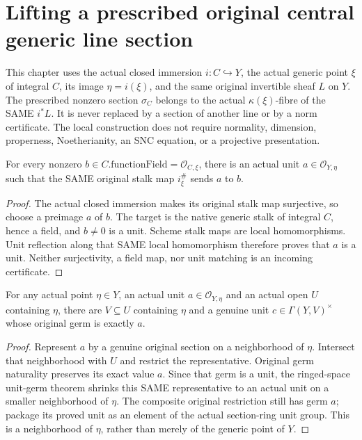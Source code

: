 \section{Lifting a prescribed original central generic line section}

This chapter uses the actual closed immersion $i:C\hookrightarrow Y$, the
actual generic point $\xi$ of integral $C$, its image $\eta=i(\xi)$, and the
same original invertible sheaf $L$ on $Y$.  The prescribed nonzero section
$\sigma_C$ belongs to the actual $\kappa(\xi)$-fibre of the SAME $i^*L$.
It is never replaced by a section of another line or by a norm certificate.
The local construction does not require normality, dimension, properness,
Noetherianity, an SNC equation, or a projective presentation.

\begin{lemma}
\label{lem:central-generic-original-unit-lift}
\leanok
For every nonzero $b\in C.\mathrm{functionField}=\mathcal O_{C,\xi}$,
there is an actual unit $a\in\mathcal O_{Y,\eta}$ such that the SAME
original stalk map $i_\xi^\#$ sends $a$ to $b$.
\end{lemma}
\begin{proof}
The actual closed immersion makes its original stalk map surjective, so
choose a preimage $a$ of $b$.  The target is the native generic stalk of
integral $C$, hence a field, and $b\ne0$ is a unit.  Scheme stalk maps are
local homomorphisms.  Unit reflection along that SAME local homomorphism
therefore proves that $a$ is a unit.  Neither surjectivity, a field map,
nor unit matching is an incoming certificate.
\end{proof}

\begin{lemma}
\label{lem:central-generic-original-unit-neighborhood}
\leanok
For any actual point $\eta\in Y$, an actual unit
$a\in\mathcal O_{Y,\eta}$ and an actual open $U$ containing $\eta$, there
are $V\subseteq U$ containing $\eta$ and a genuine unit
$c\in\Gamma(Y,V)^\times$ whose original germ is exactly $a$.
\end{lemma}
\begin{proof}
Represent $a$ by a genuine original section on a neighborhood of $\eta$.
Intersect that neighborhood with $U$ and restrict the representative.
Original germ naturality preserves its exact value $a$.  Since that germ
is a unit, the ringed-space unit-germ theorem shrinks this SAME
representative to an actual unit on a smaller neighborhood of $\eta$.
The composite original restriction still has germ $a$; package its proved
unit as an element of the actual section-ring unit group.  This is a
neighborhood of $\eta$, rather than merely of the generic point of $Y$.
\end{proof}

